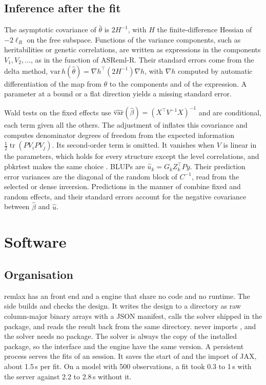 \documentclass[article,nojss]{jss}
\renewcommand{\pkg}[1]{#1}
\newcommand{\tr}{\operatorname{tr}}
\begin{document}
\subsection{Inference after the fit}\label{sec:inference}

The asymptotic covariance of $\hat\theta$ is $2H^{-1}$, with $H$ the
finite-difference Hessian of $-2\ell_R$ on the free subspace. Functions of the
variance components, such as heritabilities or genetic correlations, are
written as expressions in the components $V_1, V_2, \dots$, as in the
 function of \pkg{ASReml-R}. Their standard errors come from
the delta method, $\mathrm{var}\,h(\hat\theta) = \nabla h^\top (2H^{-1})
\nabla h$, with $\nabla h$ computed by automatic differentiation of the map
from $\theta$ to the components and of the expression. A parameter at a bound
or a flat direction yields a missing standard error.

Wald tests on the fixed effects use $\widehat{\mathrm{var}}(\hat\beta) =
(X^\top V^{-1}X)^{-1}$ and are conditional, each term given all the others.
The adjustment of \citet{kenward1997} inflates this covariance and computes
denominator degrees of freedom from the expected information
$\tfrac12\tr(PV_iPV_j)$. Its second-order term is omitted. It vanishes when
$V$ is linear in the parameters, which holds for every structure except the
level correlations, and \pkg{pbkrtest} makes the same choice
\citep{halekoh2014}. BLUPs are $\hat u_k = G_k Z_k^\top P y$. Their prediction
error variances are the diagonal of the random block of $C^{-1}$, read from
the selected or dense inversion. Predictions in the manner of
 combine fixed and random effects, and their standard
errors account for the negative covariance between $\hat\beta$ and $\hat u$.

\section{Software}\label{sec:software}

\subsection{Organisation}

\pkg{remlax} has an  front end and a  engine that
share no code and no runtime. The  side builds and checks the
design. It writes the design to a directory as raw column-major binary arrays
with a JSON manifest, calls the solver shipped in the package, and reads the
result back from the same directory.  never imports
, and the solver needs no  package. The solver is
always the copy of the installed package, so the interface and the engine
have the same version. A persistent  process serves the fits
of an  session. It saves the start of  and the
import of \pkg{JAX}, about 1.5\,s per fit. On a model with 500 observations,
a fit took 0.3 to 1\,s with the server against 2.2 to 2.8\,s without it.
\end{document}
